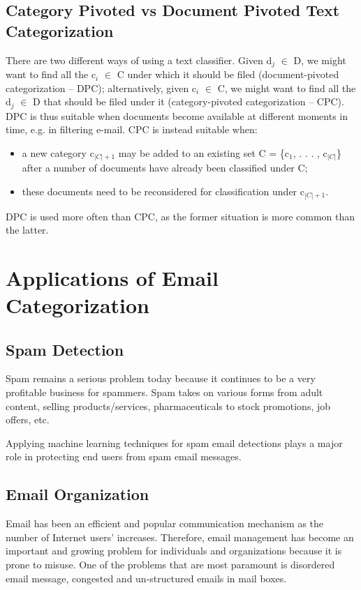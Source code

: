 \subsection{Category Pivoted vs Document Pivoted Text Categorization}
There are two different ways of using a text classifier. Given d$_{j}$ $\in$ D, we might want
to find all the c$_{i}$ $\in$ C under which it should be filed (document-pivoted categorization
– DPC); alternatively, given c$_{i}$ $\in$ C, we might want to find all the d$_{j}$ $\in$ D that should be filed under it (category-pivoted categorization – CPC).
DPC is thus suitable when documents become available at different moments in time, e.g. in filtering e-mail. CPC is instead suitable when: 
\begin{itemize}
\item a new category c$_{|C|+1}$ may be added to an existing set C = \{c$_{1}$, . . . , c$_{|C|}$\} after a number of documents have already been classified under C;
\item these documents need to be reconsidered for classification under c$_{|C|+1}$.
\end{itemize}
DPC is used more often than CPC, as the former situation is more common than 
the latter. \cite{Sebastiani2002}

\section{Applications of Email Categorization}
\subsection{Spam Detection}
Spam remains a serious problem today because it continues to be a very 
profitable business for spammers. Spam takes on various forms from adult 
content, selling products/services, pharmaceuticals to stock promotions, 
job offers, etc.

Applying machine learning techniques for spam email detections plays a major 
role in protecting end users from spam email messages.\cite{peifeng2007}

\subsection{Email Organization}
Email has been an efficient and popular communication mechanism as the 
number of Internet users’ increases. Therefore, email management has 
become an important and growing problem for individuals and organizations 
because it is prone to misuse. One of the problems that are most paramount 
is disordered email message, congested and un-structured emails in mail 
boxes.

